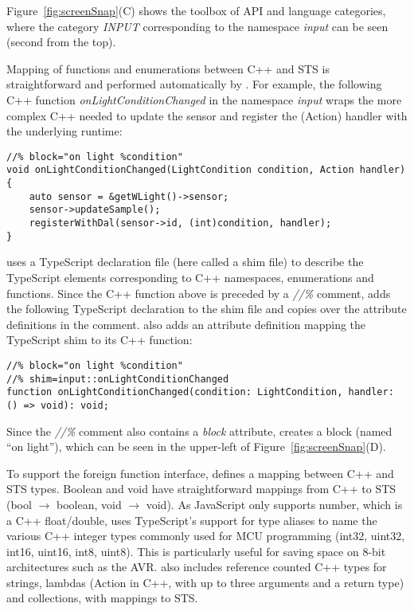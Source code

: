 Figure~\ref{fig:screenSnap}(C) shows the toolbox of API and language categories, where the
category \emph{INPUT} corresponding to the namespace \emph{input} can be seen (second
from the top).

Mapping of functions and enumerations between C++ and STS is straightforward
and performed automatically by \MC.
For example, the following C++ function \emph{onLightConditionChanged}
in the namespace \emph{input}
wraps the more complex C++ needed to update the sensor and register the (Action)
handler with the underlying \CO runtime:
\begin{lstlisting}
//% block="on light %condition"
void onLightConditionChanged(LightCondition condition, Action handler) {
    auto sensor = &getWLight()->sensor;
    sensor->updateSample();
    registerWithDal(sensor->id, (int)condition, handler);
}
\end{lstlisting}

\MC uses a TypeScript declaration file (here called a shim file) to describe the TypeScript
elements corresponding to C++ namespaces, enumerations and functions.
Since the C++ function above is preceded by a \emph{//\%} comment,
\MC adds the following TypeScript declaration to the shim file and copies
over the attribute definitions in the comment. \MC also adds an attribute definition mapping
the TypeScript shim to its C++ function:

\begin{lstlisting}
//% block="on light %condition"
//% shim=input::onLightConditionChanged
function onLightConditionChanged(condition: LightCondition, handler: () => void): void;
\end{lstlisting}

Since the \emph{//\%} comment also contains a \emph{block} attribute, \MC creates a block (named ``on light''), which can be seen in the upper-left of Figure~\ref{fig:screenSnap}(D).

To support the foreign function interface, \MC defines a mapping between C++ and STS types.
Boolean and void have straightforward mappings from C++ to STS (bool $\rightarrow$ boolean, void $\rightarrow$ void).
As JavaScript only supports number, which is a C++ float/double, \MC uses TypeScript's support
for type aliases to name the various C++ integer types commonly used for MCU programming
(int32, uint32, int16, uint16, int8, uint8).
This is particularly useful for saving space on 8-bit architectures such as the AVR.
\MC also includes reference counted C++ types for strings, lambdas (Action in C++, with
up to three arguments and a return type) and collections, with mappings to STS.

